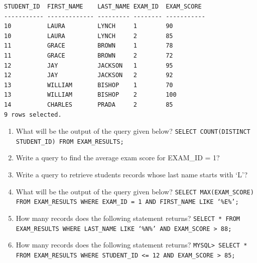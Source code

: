 \documentclass[11pt,a4paper]{article}
\def\AnswerBox{\fbox{\begin{minipage}{4in}\hfill\vspace{0.5in}\end{minipage}}}
\begin{document}
\begin{description}
\begin{verbatim}
STUDENT_ID  FIRST_NAME    LAST_NAME EXAM_ID  EXAM_SCORE
----------- ------------- --------- -------- -----------
10          LAURA         LYNCH	    1        90 
10          LAURA         LYNCH     2        85
11          GRACE         BROWN     1        78
11          GRACE         BROWN     2        72
12          JAY           JACKSON   1        95
12          JAY           JACKSON   2        92
13          WILLIAM       BISHOP    1        70
13          WILLIAM       BISHOP    2        100
14          CHARLES       PRADA     2        85
9 rows selected.
\end{verbatim}

\begin{enumerate}[label=\bfseries Q\arabic*:]\itemsep10pt
\item What will be the output of the query given below?\newline
\texttt{SELECT COUNT(DISTINCT STUDENT\_ID) FROM EXAM\_RESULTS;}
\item Write a query to find the average exam score for EXAM\_ID = 1?
\item Write a query to retrieve students records whose last name starts with `L'?
\item What will be the output of the query given below?\newline
\texttt{SELECT MAX(EXAM\_SCORE) FROM EXAM\_RESULTS WHERE EXAM\_ID = 1 AND FIRST\_NAME LIKE `\%E\%';}

\item How many records does the following statement returns?\newline
\texttt{SELECT * FROM EXAM\_RESULTS WHERE LAST\_NAME LIKE `\%N\%' AND EXAM\_SCORE > 88;}
\item How many records does the following statement returns?\newline 
\texttt{MYSQL> SELECT * FROM EXAM\_RESULTS WHERE STUDENT\_ID <= 12 AND EXAM\_SCORE > 85;}
\end{enumerate}

\end{description}
\end{document}
